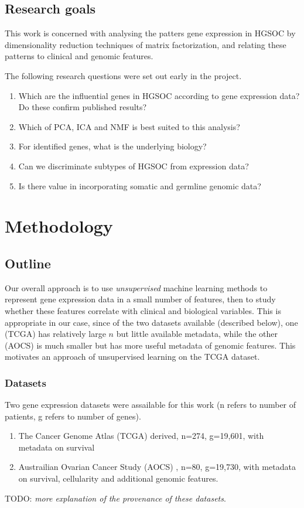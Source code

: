\documentclass[draft, tikz, 12pt,a4paper,oneside,fleqn]{article}
\begin{document}
\subsection{Research goals}
This work is concerned with analysing the patters gene expression in HGSOC by dimensionality reduction techniques of matrix factorization, and relating these patterns to clinical and genomic features.

The following research questions were set out early in the project. 
\begin{enumerate}
\item Which are the influential genes in HGSOC according to gene expression data?   Do these confirm published results?
\item Which of PCA, ICA and NMF is best suited to this analysis?
\item For identified genes, what is the underlying biology?
\item Can we discriminate subtypes of HGSOC from expression data?
\item Is there value in incorporating somatic and germline genomic data?
\end{enumerate}


\section{Methodology}

\subsection{Outline}

Our overall approach is to use \emph{unsupervised} machine learning methods to represent gene expression data in a small number of features, then to study whether these features correlate with clinical and biological variables.  This is appropriate in our case, since of the two datasets available (described below), one (TCGA) has relatively large $n$ but little available metadata, while the other (AOCS) is much smaller but has more useful metadata of genomic features.   This motivates an approach of unsupervised learning on the TCGA dataset. 

\subsubsection{Datasets}
Two gene expression datasets were assailable for this work (n refers to number of patients, g refers to number of genes).
\begin{enumerate}
\item The Cancer Genome Atlas (TCGA) derived, n=274, g=19,601, with metadata on survival
\item Austrailian Ovarian Cancer Study (AOCS) \cite{Patch2015}, n=80, g=19,730, with metadata on survival, cellularity and additional genomic features.
\end{enumerate}
TODO: \emph{more explanation of the provenance of these datasets}.
\end{document}
